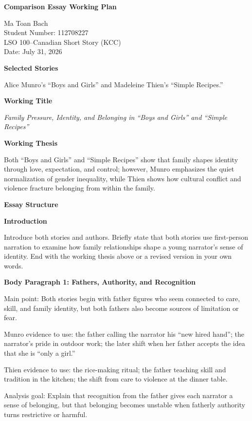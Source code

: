 \documentclass[12pt]{article}
\begin{document}
\begin{center}
\textbf{Comparison Essay Working Plan}
\end{center}

Ma Toan Bach\\
Student Number: 112708227\\
LSO 100--Canadian Short Story (KCC)\\
Date: July 31, 2026

\vspace{0.5em}
\textbf{Selected Stories}

Alice Munro's ``Boys and Girls'' and Madeleine Thien's ``Simple Recipes.''

\textbf{Working Title}

\textit{Family Pressure, Identity, and Belonging in ``Boys and Girls'' and ``Simple Recipes''}

\textbf{Working Thesis}

Both ``Boys and Girls'' and ``Simple Recipes'' show that family shapes identity through love, expectation, and control; however, Munro emphasizes the quiet normalization of gender inequality, while Thien shows how cultural conflict and violence fracture belonging from within the family.

\textbf{Essay Structure}

\textbf{Introduction}

Introduce both stories and authors. Briefly state that both stories use first-person narration to examine how family relationships shape a young narrator's sense of identity. End with the working thesis above or a revised version in your own words.

\textbf{Body Paragraph 1: Fathers, Authority, and Recognition}

Main point: Both stories begin with father figures who seem connected to care, skill, and family identity, but both fathers also become sources of limitation or fear.

Munro evidence to use: the father calling the narrator his ``new hired hand''; the narrator's pride in outdoor work; the later shift when her father accepts the idea that she is ``only a girl.''

Thien evidence to use: the rice-making ritual; the father teaching skill and tradition in the kitchen; the shift from care to violence at the dinner table.

Analysis goal: Explain that recognition from the father gives each narrator a sense of belonging, but that belonging becomes unstable when fatherly authority turns restrictive or harmful.
\end{document}
